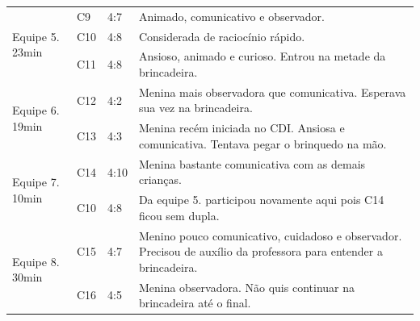\begin{quadro}[!h]
{\begin{footnotesize}
{\begin{tabular}{|l|l|l|p{11cm}|}
            \hline
            \multirow{3}{*}{Equipe 5. 23min}                & C9               & 4:7                          & Animado, comunicativo e observador.                                                                                \\ 
            \cline{2-4}
                                                            & C10              & 4:8                          & Considerada de raciocínio rápido.                                                                                  \\ 
            \cline{2-4}
                                                            & C11              & 4:8                          & Ansioso, animado e curioso. Entrou na metade da brincadeira.                                                       \\ 
            \hline
            \multirow{2}{*}{Equipe 6. 19min}                & C12              & 4:2                          & Menina mais observadora que comunicativa. Esperava sua vez na brincadeira.                                         \\ 
            \cline{2-4}
                                                            & C13              & 4:3                          & Menina recém iniciada no CDI. Ansiosa e comunicativa. Tentava pegar o brinquedo na mão.                            \\ 
            \hline
            \multirow{2}{*}{Equipe 7. 10min}                & C14              & 4:10                         & Menina bastante comunicativa com as demais crianças.                                                               \\ 
            \cline{2-4}
                                                            & C10              & 4:8                          & Da equipe 5. participou novamente aqui pois C14 ficou sem dupla.                                                  \\ 
            \hline
            \multirow{2}{*}{Equipe 8. 30min}                & C15              & 4:7                          & Menino pouco comunicativo, cuidadoso e observador. Precisou de auxílio da professora para entender a brincadeira.  \\ 
            \cline{2-4}
                                                            & C16              & 4:5                          & Menina observadora. Não quis continuar na brincadeira até o final.                                                 \\ 

\end{tabular}}
\end{footnotesize}}
\end{quadro}
